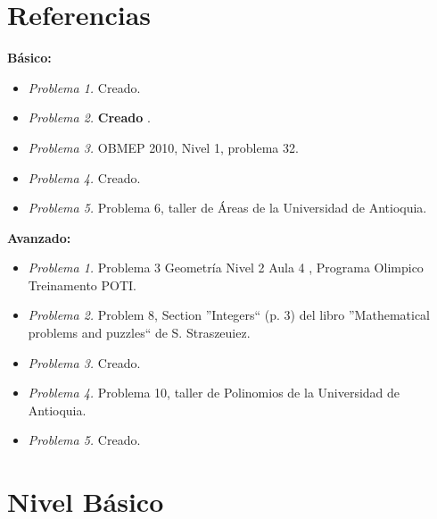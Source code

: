 \newpage
\section*{Referencias}
\textbf{Básico: }
\begin{itemize}
	\item \textit{Problema 1.} Creado.
	\item \textit{Problema 2.} \textbf{Creado }.
	\item \textit{Problema 3.} OBMEP 2010, Nivel 1, problema 32.
	\item \textit{Problema 4.} Creado.
	\item \textit{Problema 5.} Problema 6, taller de Áreas de la Universidad de Antioquia.
\end{itemize}

\textbf{Avanzado: }
\begin{itemize}
	\item \textit{Problema 1.} Problema 3 Geometría Nivel 2 Aula 4 , Programa Olimpico Treinamento POTI.
	\item	\textit{Problema 2.} Problem 8, Section ''Integers`` (p. 3) del libro ''Mathematical problems and puzzles`` de S. Straszeuiez. 
	\item	\textit{Problema 3.} Creado.
	\item	\textit{Problema 4.} Problema 10, taller de Polinomios de la Universidad de Antioquia.
	\item	\textit{Problema 5.} Creado.
\end{itemize}


\newpage
\section{Nivel Básico}\label{basico:2020_10_octubre}

\begin{center}
\end{center}

